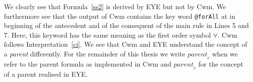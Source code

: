 % 
% 
We clearly see that Formula~\ref{ss2} is derived by EYE but not by Cwm. 
We furthermore see that the output of Cwm contains the key word \texttt{@forAll} at in beginning of the antecedent and of the consequent of the main rule in Lines 5 and 7. 
Here, this keyword has the same meaning as the first order symbol $\forall$. Cwm follows Interpretation~\ref{ci}.  We see that 
Cwm and EYE understand the concept of a \emph{parent} differently.
For the remainder of this thesis we write $\textit{parent}_c$ when we refer to the parent formula as implemented in Cwm and $\textit{parent}_e$ 
for the concept of a parent realised in EYE.

